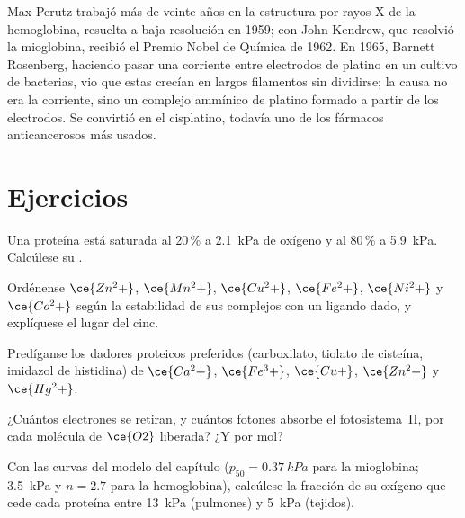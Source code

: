 \begin{history}
Max Perutz trabajó más de veinte años en la estructura por rayos X de la
hemoglobina, resuelta a baja resolución en 1959; con John Kendrew, que resolvió la
mioglobina, recibió el Premio Nobel de Química de 1962. En 1965, Barnett
Rosenberg, haciendo pasar una corriente entre electrodos de platino en un cultivo de
bacterias, vio que estas crecían en largos filamentos sin dividirse; la causa no
era la corriente, sino un complejo ammínico de platino formado a partir de los electrodos. Se
convirtió en el cisplatino, todavía uno de los fármacos anticancerosos más usados.
\end{history}

\section{Ejercicios}

\begin{exercise}[$\star$]\label{exo:b3:bioinorganic:1}
Una proteína está saturada al 20\,\% a \qty{2.1}{kPa} de oxígeno y al 80\,\% a \qty{5.9}{kPa}. Calcúlese su
.
\end{exercise}

\begin{exercise}[$\star$]\label{exo:b3:bioinorganic:2}
Ordénense $\ce{Zn^2+}$, $\ce{Mn^2+}$, $\ce{Cu^2+}$, $\ce{Fe^2+}$, $\ce{Ni^2+}$ y $\ce{Co^2+}$ según la estabilidad de sus complejos con
un ligando dado, y explíquese el lugar del cinc.
\end{exercise}

\begin{exercise}[$\star$]\label{exo:b3:bioinorganic:3}
Predíganse los dadores proteicos preferidos (carboxilato, tiolato de cisteína,
imidazol de histidina) de $\ce{Ca^2+}$, $\ce{Fe^3+}$, $\ce{Cu+}$, $\ce{Zn^2+}$ y $\ce{Hg^2+}$.
\end{exercise}

\begin{exercise}[$\star$]\label{exo:b3:bioinorganic:4}
¿Cuántos electrones se retiran, y cuántos fotones absorbe el fotosistema~II,
por cada molécula de $\ce{O2}$ liberada? ¿Y por mol?
\end{exercise}

\begin{exercise}[$\star\star$]\label{exo:b3:bioinorganic:5}
Con las curvas del modelo del capítulo ($p_{50} = \qty{0.37}{kPa}$ para la mioglobina; \qty{3.5}{kPa} y $n = 2.7$ para la
hemoglobina), calcúlese la fracción de su oxígeno que cede cada proteína entre
\qty{13}{kPa} (pulmones) y \qty{5}{kPa} (tejidos).
\end{exercise}

